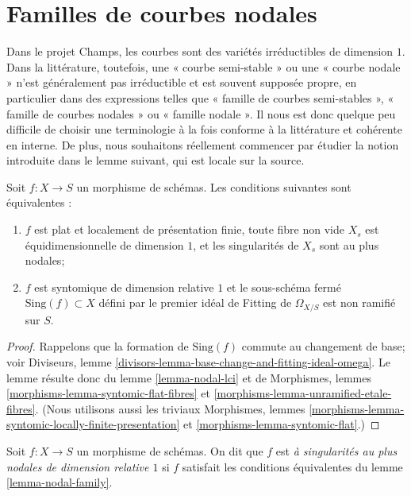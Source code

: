 \section{Familles de courbes nodales}
\label{section-families-nodal}

\noindent
Dans le projet Champs, les courbes sont des variétés irréductibles de dimension $1$. Dans la littérature, toutefois, une « courbe semi-stable » ou une « courbe nodale » n'est généralement pas irréductible et est souvent supposée propre, en particulier dans des expressions telles que « famille de courbes semi-stables », « famille de courbes nodales » ou « famille nodale ». Il nous est donc quelque peu difficile de choisir une terminologie à la fois conforme à la littérature et cohérente en interne. De plus, nous souhaitons réellement commencer par étudier la notion introduite dans le lemme suivant, qui est locale sur la source.

\begin{lemma}
\label{lemma-nodal-family}
Soit $f : X \to S$ un morphisme de schémas. Les conditions suivantes sont équivalentes : \begin{enumerate} \item $f$ est plat et localement de présentation finie, toute fibre non vide $X_s$ est équidimensionnelle de dimension $1$, et les singularités de $X_s$ sont au plus nodales; \item $f$ est syntomique de dimension relative $1$ et le sous-schéma fermé $\text{Sing}(f) \subset X$ défini par le premier idéal de Fitting de $\Omega_{X/S}$ est non ramifié sur $S$.
\end{enumerate}
\end{lemma}

\begin{proof}
Rappelons que la formation de $\text{Sing}(f)$ commute au changement de base; voir Diviseurs, lemme \ref{divisors-lemma-base-change-and-fitting-ideal-omega}. Le lemme résulte donc du lemme \ref{lemma-nodal-lci} et de Morphismes, lemmes \ref{morphisms-lemma-syntomic-flat-fibres} et \ref{morphisms-lemma-unramified-etale-fibres}. (Nous utilisons aussi les triviaux Morphismes, lemmes \ref{morphisms-lemma-syntomic-locally-finite-presentation} et \ref{morphisms-lemma-syntomic-flat}.)
\end{proof}

\begin{definition}
\label{definition-nodal-family}
Soit $f : X \to S$ un morphisme de schémas. On dit que $f$ est {\it à singularités au plus nodales de dimension relative $1$} si $f$ satisfait les conditions équivalentes du lemme \ref{lemma-nodal-family}.
\end{definition}


